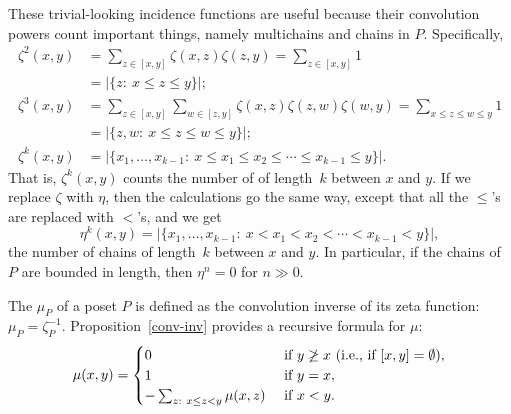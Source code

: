 These trivial-looking incidence functions are useful because their convolution
powers count important things, namely multichains and chains in $P$.  Specifically,
  \begin{align*}
  \zeta^2(x,y) &= \sum_{z\in[x,y]} \zeta(x,z)\zeta(z,y)
    = \sum_{z\in[x,y]} 1\\
    &= \Big|\{z:\ x\leq z\leq y\}\Big|;\\
  \zeta^3(x,y) &= \sum_{z\in[x,y]} \sum_{w\in[z,y]} \zeta(x,z)\zeta(z,w)\zeta(w,y)
    = \sum_{x\leq z\leq w\leq y} 1\\
    &= \Big|\{z,w:\ x\leq z\leq w\leq y\}\Big|;\\
  \zeta^k(x,y) &= \Big|\{x_1,\dots,x_{k-1}:\ x\leq x_1\leq x_2\leq \cdots \leq x_{k-1}\leq y\}\Big|.
  \end{align*}
That is, $\zeta^k(x,y)$ counts the number of 
of length~$k$ between $x$ and $y$.
If we replace $\zeta$ with $\eta$, then the calculations go the same way, except that all the
$\leq$'s are replaced with $<$'s, and we get
\[\eta^k(x,y) = \Big|\{x_1,\dots,x_{k-1}:\ x<x_1<x_2<\cdots<x_{k-1}<y\}\Big|,\]
the number of  chains of length~$k$ between $x$ and $y$.  In particular, if the chains of $P$ are bounded in length, then $\eta^n=0$ for $n\gg 0$.

The  $\mu_P$ of a poset $P$ is defined as the convolution inverse of its zeta function: $\mu_P=\zeta_P^{-1}$.
Proposition~\ref{conv-inv} provides a recursive formula for $\mu$:
\[
\mu(x,y) =
\begin{cases}
0 &\text{ if } y\not\geq x\ \text{(i.e., if $[x,y]=\emptyset$)},\\
1 & \text{ if } y=x,\\
-\sum_{z:\ x\leq z<y}\mu(x,z) & \text{ if } x<y.
\end{cases}
\]

